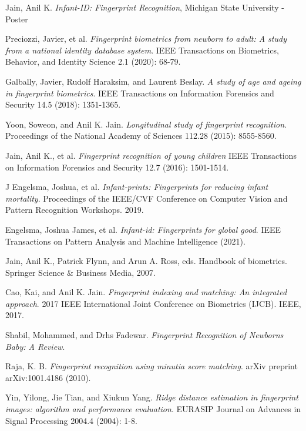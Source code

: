 \documentclass[12pt,a4paper]{article}
\begin{document}
\begin{thebibliography}{1}
	
	Jain, Anil K. \emph{Infant-ID: Fingerprint Recognition}, Michigan State University - Poster
	
	Preciozzi, Javier, et al. \emph{Fingerprint biometrics from newborn to adult: A study from a national identity database system}. IEEE Transactions on Biometrics, Behavior, and Identity Science 2.1 (2020): 68-79.
	
	Galbally, Javier, Rudolf Haraksim, and Laurent Beslay. \emph{A study of age and ageing in fingerprint biometrics}. IEEE Transactions on Information Forensics and Security 14.5 (2018): 1351-1365.
	
	Yoon, Soweon, and Anil K. Jain. \emph{Longitudinal study of fingerprint recognition}. Proceedings of the National Academy of Sciences 112.28 (2015): 8555-8560.
	
	Jain, Anil K., et al. \emph{Fingerprint recognition of young children} IEEE Transactions on Information Forensics and Security 12.7 (2016): 1501-1514.
	
	J Engelsma, Joshua, et al. \emph{Infant-prints: Fingerprints for reducing infant mortality}. Proceedings of the IEEE/CVF Conference on Computer Vision and Pattern Recognition Workshops. 2019.
	
	Engelsma, Joshua James, et al. \emph{Infant-id: Fingerprints for global good}. IEEE Transactions on Pattern Analysis and Machine Intelligence (2021).
	
	
	Jain, Anil K., Patrick Flynn, and Arun A. Ross, eds. Handbook of biometrics. Springer Science \& Business Media, 2007.
	
	Cao, Kai, and Anil K. Jain. \emph{Fingerprint indexing and matching: An integrated approach}. 2017 IEEE International Joint Conference on Biometrics (IJCB). IEEE, 2017.
	
	Shabil, Mohammed, and Drhs Fadewar. \emph{Fingerprint Recognition of Newborns Baby: A Review}.
	
	Raja, K. B. \emph{Fingerprint recognition using minutia score matching}. arXiv preprint arXiv:1001.4186 (2010).
	
	Yin, Yilong, Jie Tian, and Xiukun Yang. \emph{Ridge distance estimation in fingerprint images: algorithm and performance evaluation}. EURASIP Journal on Advances in Signal Processing 2004.4 (2004): 1-8.
	
\end{thebibliography}
\end{document}
